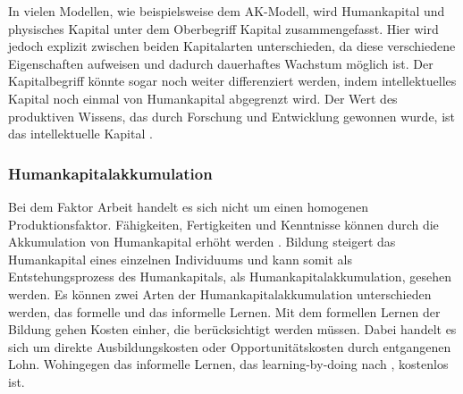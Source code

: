 %
In vielen Modellen, wie beispielsweise dem AK-Modell, wird Humankapital und physisches Kapital unter dem Oberbegriff Kapital zusammengefasst. Hier wird jedoch explizit zwischen beiden Kapitalarten unterschieden, da diese verschiedene Eigenschaften aufweisen und dadurch dauerhaftes Wachstum möglich ist. Der Kapitalbegriff könnte sogar noch weiter differenziert werden, indem intellektuelles Kapital noch einmal von Humankapital abgegrenzt wird. Der Wert des produktiven Wissens, das durch Forschung und Entwicklung gewonnen wurde, ist das intellektuelle Kapital \cite[S. 81]{Dosi.1993}. 
%
\subsubsection{Humankapitalakkumulation}
%
Bei dem Faktor Arbeit handelt es sich nicht um einen homogenen Produktionsfaktor. Fähigkeiten, Fertigkeiten und Kenntnisse können durch die Akkumulation von Humankapital erhöht werden \cite[S.205]{Aghion.2015}.  Bildung steigert das Humankapital eines einzelnen Individuums und kann somit als Entstehungsprozess des Humankapitals, als Humankapitalakkumulation, gesehen werden. Es können zwei Arten der Humankapitalakkumulation unterschieden werden, das formelle und das informelle Lernen. Mit dem formellen Lernen der Bildung gehen Kosten einher, die berücksichtigt werden müssen. Dabei handelt es sich um direkte Ausbildungskosten oder Opportunitätskosten durch entgangenen Lohn. Wohingegen das informelle Lernen, das learning-by-doing nach \cite{Arrow.1969}, kostenlos ist.
%
